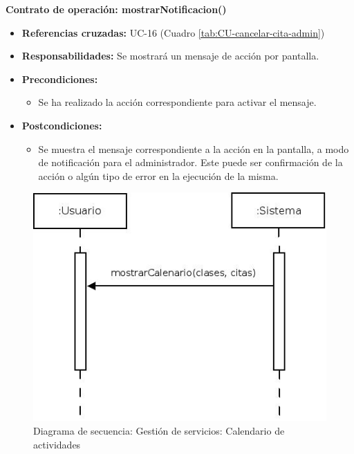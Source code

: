 \textbf{Contrato de operación: mostrarNotificacion()}
\begin{itemize}
\item \textbf{Referencias cruzadas:} UC-16 (Cuadro \ref{tab:CU-cancelar-cita-admin})
\item \textbf{Responsabilidades:} Se mostrará un mensaje de acción por pantalla.
\item \textbf{Precondiciones:} 
 \begin{itemize}
\item Se ha realizado la acción correspondiente para activar el mensaje.
\end {itemize}
\item \textbf{Postcondiciones:} 
 \begin{itemize}
\item Se muestra el mensaje correspondiente a la acción en la pantalla, a modo de notificación para el administrador. Este puede ser confirmación de la acción o algún tipo de error en la ejecución de la misma.
\end {itemize}
\end {itemize}


\vspace{7mm}
\dotfill
\vspace{7mm}

\begin{figure}[h!]
\centering
  \includegraphics[scale=.55]{img/secuencias/gestion-servicios-calendario.jpeg}
  \caption{Diagrama de secuencia: Gestión de servicios: Calendario de actividades}
  \label{fig:secuencia-gestion-servicios-calendario}
\end{figure}

